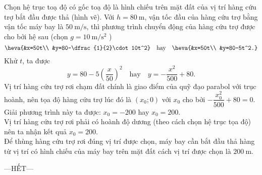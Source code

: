 \begin{ex}
{\begin{center}
\begin{tikzpicture}[font=\footnotesize, line join=round, line cap=round, >=stealth]
				\end{tikzpicture}
		\end{center}
		Chọn hệ trục toạ độ có gốc toạ độ là hình chiếu trên mặt đất của vị trí hàng cứu trợ bắt đầu được thả (hình vẽ). Với $h=80 \mathrm{~m}$, vận tốc đầu của hàng cứu trợ bằng vận tốc máy bay là $50 \mathrm{~m} / \mathrm{s}$, thì phương trình chuyển động của hàng cứu trợ được cho bởi hệ sau (chọn $g=10 \mathrm{~m} / \mathrm{s}^{2}$ )
		\[\heva{&x=50t\\ &y=80-\dfrac{1}{2}\cdot 10t^2} \quad\text{hay}\quad \heva{&x=50t\\ &y=80-5t^2.}\]
		Khử $t$, ta được
		$$
		y=80-5\left(\dfrac{x}{50}\right)^{2} \quad\text {hay}\quad y=-\dfrac{x^{2}}{500}+80.
		$$
		Vị trí hàng cứu trợ rơi chạm đất chính là giao điểm của quỹ đạo parabol với trục hoành, nên tọa độ hàng cứu trợ lúc đó là $\left(x_{0} ; 0\right)$ với $x_{0}$ cho bởi $-\dfrac{x_0^2}{500}+80=0$. Giải phương trình này ta được: $x_{0}=-200$ hay $x_{0}=200$.\\
		Vị trí hàng cứu trợ rơi phải có hoành độ dương (theo cách chọn hệ trục tọa độ) nên ta nhận kết quả $x_{0}=200$.\\
		Để thùng hàng cứu trợ rơi đúng vị trí được chọn, máy bay cần bắt đầu thả hàng từ vị trí có hình chiếu của máy bay trên mặt đất cách vị trí được chọn là $200 \mathrm{~m}$.
	}
\end{ex}
\centerline{---HẾT---}
